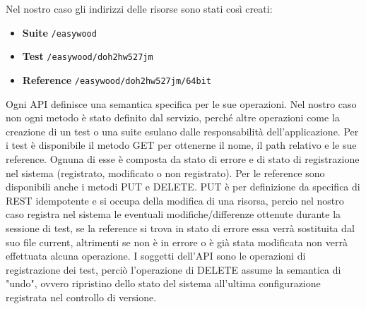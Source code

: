         Nel nostro caso gli indirizzi delle risorse sono stati così creati: 
        \begin{itemize}
            \item \textbf{Suite} \verb|/easywood|
            \item \textbf{Test} \verb|/easywood/doh2hw527jm|
            \item \textbf{Reference} \verb|/easywood/doh2hw527jm/64bit|
        \end{itemize}
        
        Ogni API definisce una semantica specifica per le sue operazioni.
        Nel nostro caso non ogni metodo è stato definito dal servizio, perché altre operazioni come la creazione di un test o una suite esulano dalle responsabilità dell'applicazione.
        Per i test è disponibile il metodo GET per  ottenerne il nome, il path relativo e le sue reference.
        Ognuna di esse è composta da stato di errore e di stato di registrazione nel sistema (registrato, modificato o non registrato).
        Per le reference sono disponibili anche i metodi PUT e DELETE. PUT è per definizione da specifica di REST idempotente e si occupa della modifica di una risorsa, percio nel nostro caso registra nel sistema le eventuali modifiche/differenze ottenute durante la sessione di test, se la reference si trova in stato di errore essa verrà sostituita dal suo file current, altrimenti se non è in errore o è già stata modificata non verrà effettuata alcuna operazione.
        I soggetti dell'API sono le operazioni di registrazione dei test, perciò l'operazione di DELETE assume la semantica di "undo", ovvero ripristino dello stato del sistema all'ultima configurazione registrata nel controllo di versione.
        